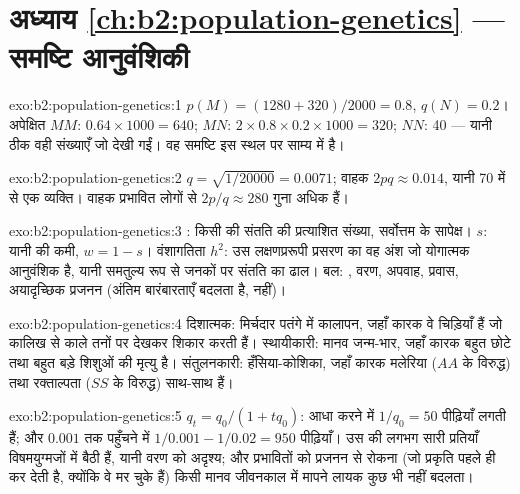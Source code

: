 \section*{अध्याय \ref{ch:b2:population-genetics} --- समष्टि आनुवंशिकी}

\begin{solution}{exo:b2:population-genetics:1}
$p(M) = (1280 + 320)/2000 = 0.8$, $q(N) = 0.2$। अपेक्षित $MM$:
$0.64\times 1000 = 640$; $MN$: $2\times 0.8\times 0.2\times 1000 =
320$; $NN$: 40 --- यानी ठीक वही संख्याएँ जो देखी गईं। वह समष्टि इस स्थल पर
साम्य में है।
\end{solution}

\begin{solution}{exo:b2:population-genetics:2}
$q = \sqrt{1/20000} = 0.0071$; वाहक $2pq \approx 0.014$, यानी 70 में
से एक व्यक्ति। वाहक प्रभावित लोगों से $2p/q \approx
280$ गुना अधिक हैं।
\end{solution}

\begin{solution}{exo:b2:population-genetics:3}
: किसी  की संतति की प्रत्याशित संख्या,
सर्वोत्तम के सापेक्ष।  $s$: यानी  की कमी, $w = 1 -
s$। वंशागतिता $h^{2}$: उस लक्षणप्ररूपी प्रसरण का वह अंश
जो योगात्मक आनुवंशिक है, यानी समतुल्य रूप से जनकों पर संतति का
ढाल। बल: , वरण, अपवाह, प्रवास, अयादृच्छिक
प्रजनन (अंतिम  बारंबारताएँ बदलता है,  नहीं)।
\end{solution}

\begin{solution}{exo:b2:population-genetics:4}
दिशात्मक: मिर्चदार पतंगे में कालापन, जहाँ कारक वे चिड़ियाँ हैं जो
कालिख से काले तनों पर देखकर शिकार करती हैं। स्थायीकारी: मानव जन्म-भार,
जहाँ कारक बहुत छोटे तथा बहुत बड़े शिशुओं की मृत्यु है। संतुलनकारी:
हँसिया-कोशिका, जहाँ कारक मलेरिया ($AA$ के विरुद्ध) तथा रक्ताल्पता ($SS$ के
विरुद्ध) साथ-साथ हैं।
\end{solution}

\begin{solution}{exo:b2:population-genetics:5}
$q_t = q_0/(1 + tq_0)$: आधा करने में $1/q_0 = 50$ पीढ़ियाँ लगती हैं;
और $0.001$ तक पहुँचने में $1/0.001 - 1/0.02 = 950$ पीढ़ियाँ। उस
 की लगभग सारी प्रतियाँ विषमयुग्मजों में बैठी हैं, यानी वरण को
अदृश्य; और प्रभावितों को प्रजनन से रोकना (जो प्रकृति पहले ही कर देती है,
क्योंकि वे मर चुके हैं) किसी मानव जीवनकाल में मापने लायक कुछ भी नहीं
बदलता।
\end{solution}

